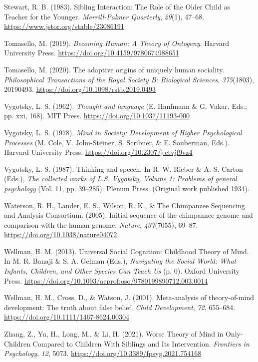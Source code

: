 \documentclass[
]{scrbook}
\newlength{\cslhangindent}
\newenvironment{CSLReferences}[2] %
 {\begin{list}{}{%
  \setlength{\itemindent}{0pt}
  \setlength{\leftmargin}{0pt}
  \setlength{\parsep}{0pt}
  \ifodd #1
   \setlength{\leftmargin}{\cslhangindent}
   \setlength{\itemindent}{-1\cslhangindent}
  \fi
  \setlength{\itemsep}{#2\baselineskip}}}
 {\end{list}}
\begin{document}
\begin{CSLReferences}{1}{0}
Stewart, R. B. (1983). Sibling {Interaction}: {The Role} of the {Older Child} as {Teacher} for the {Younger}. \emph{Merrill-Palmer Quarterly}, \emph{29}(1), 47--68. \url{https://www.jstor.org/stable/23086191}

Tomasello, M. (2019). \emph{Becoming {Human}: {A Theory} of {Ontogeny}}. Harvard University Press. \url{https://doi.org/10.4159/9780674988651}

Tomasello, M. (2020). The adaptive origins of uniquely human sociality. \emph{Philosophical Transactions of the Royal Society B: Biological Sciences}, \emph{375}(1803), 20190493. \url{https://doi.org/10.1098/rstb.2019.0493}

Vygotsky, L. S. (1962). \emph{Thought and language} (E. Hanfmann \& G. Vakar, Eds.; pp. xxi, 168). MIT Press. \url{https://doi.org/10.1037/11193-000}

Vygotsky, L. S. (1978). \emph{Mind in {Society}: {Development} of {Higher Psychological Processes}} (M. Cole, V. Jolm-Steiner, S. Scribner, \& E. Souberman, Eds.). Harvard University Press. \url{https://doi.org/10.2307/j.ctvjf9vz4}

Vygotsky, L. S. (1987). Thinking and speech. In R. W. Rieber \& A. S. Carton (Eds.), \emph{The collected works of {L}.{S}. {Vygotsky}, {Volume} 1: {Problems} of general psychology} (Vol. 11, pp. 39--285). Plenum Press. (Original work published 1934).

Waterson, R. H., Lander, E. S., Wilson, R. K., \& The Chimpanzee Sequencing and Analysis Consortium. (2005). Initial sequence of the chimpanzee genome and comparison with the human genome. \emph{Nature}, \emph{437}(7055), 69--87. \url{https://doi.org/10.1038/nature04072}

Wellman, H. M. (2013). Universal {Social Cognition}: {Childhood Theory} of {Mind}. In M. R. Banaji \& S. A. Gelman (Eds.), \emph{Navigating the {Social World}: {What Infants}, {Children}, and {Other Species Can Teach Us}} (p. 0). Oxford University Press. \url{https://doi.org/10.1093/acprof:oso/9780199890712.003.0014}

Wellman, H. M., Cross, D., \& Watson, J. (2001). Meta-analysis of theory-of-mind development: {The} truth about false belief. \emph{Child Development}, \emph{72}, 655--684. \url{https://doi.org/10.1111/1467-8624.00304}

Zhang, Z., Yu, H., Long, M., \& Li, H. (2021). Worse {Theory} of {Mind} in {Only-Children Compared} to {Children With Siblings} and {Its Intervention}. \emph{Frontiers in Psychology}, \emph{12}, 5073. \url{https://doi.org/10.3389/fpsyg.2021.754168}

\end{CSLReferences}
\end{document}

